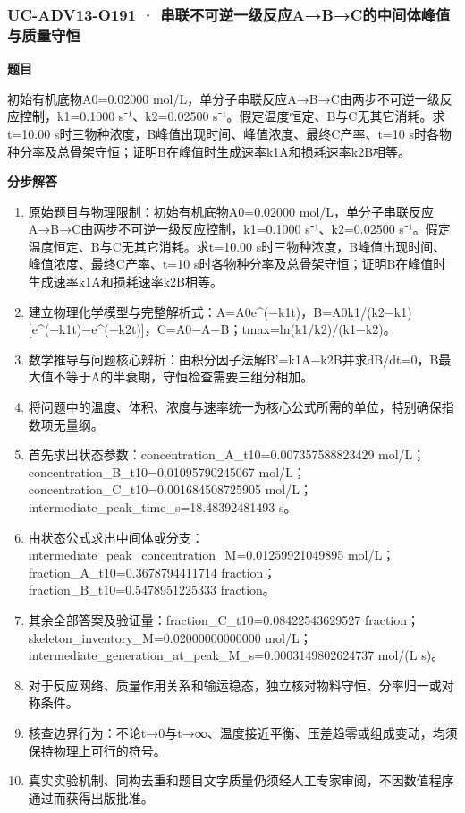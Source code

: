 \documentclass[UTF8,11pt,a4paper]{ctexart}
\begin{document}
\subsubsection*{UC-ADV13-O191 · 串联不可逆一级反应A→B→C的中间体峰值与质量守恒}
\noindent\textbf{题目}\par
初始有机底物A0=0.02000 mol/L，单分子串联反应A→B→C由两步不可逆一级反应控制，k1=0.1000 s⁻¹、k2=0.02500 s⁻¹。假定温度恒定、B与C无其它消耗。求t=10.00 s时三物种浓度，B峰值出现时间、峰值浓度、最终C产率、t=10 s时各物种分率及总骨架守恒；证明B在峰值时生成速率k1A和损耗速率k2B相等。\par
\medskip\noindent\textbf{分步解答}
\begin{enumerate}
\item 原始题目与物理限制：初始有机底物A0=0.02000 mol/L，单分子串联反应A→B→C由两步不可逆一级反应控制，k1=0.1000 s⁻¹、k2=0.02500 s⁻¹。假定温度恒定、B与C无其它消耗。求t=10.00 s时三物种浓度，B峰值出现时间、峰值浓度、最终C产率、t=10 s时各物种分率及总骨架守恒；证明B在峰值时生成速率k1A和损耗速率k2B相等。
\item 建立物理化学模型与完整解析式：A=A0e\textasciicircum{}(−k1t)，B=A0k1/(k2−k1)[e\textasciicircum{}(−k1t)−e\textasciicircum{}(−k2t)]，C=A0−A−B；tmax=ln(k1/k2)/(k1−k2)。
\item 数学推导与问题核心辨析：由积分因子法解B'=k1A−k2B并求dB/dt=0，B最大值不等于A的半衰期，守恒检查需要三组分相加。
\item 将问题中的温度、体积、浓度与速率统一为核心公式所需的单位，特别确保指数项无量纲。
\item 首先求出状态参数：concentration\_A\_t10=0.007357588823429 mol/L；concentration\_B\_t10=0.01095790245067 mol/L；concentration\_C\_t10=0.001684508725905 mol/L；intermediate\_peak\_time\_s=18.48392481493 s。
\item 由状态公式求出中间体或分支：intermediate\_peak\_concentration\_M=0.01259921049895 mol/L；fraction\_A\_t10=0.3678794411714 fraction；fraction\_B\_t10=0.5478951225333 fraction。
\item 其余全部答案及验证量：fraction\_C\_t10=0.08422543629527 fraction；skeleton\_inventory\_M=0.02000000000000 mol/L；intermediate\_generation\_at\_peak\_M\_s=0.0003149802624737 mol/(L s)。
\item 对于反应网络、质量作用关系和输运稳态，独立核对物料守恒、分率归一或对称条件。
\item 核查边界行为：不论t→0与t→∞、温度接近平衡、压差趋零或组成变动，均须保持物理上可行的符号。
\item 真实实验机制、同构去重和题目文字质量仍须经人工专家审阅，不因数值程序通过而获得出版批准。
\end{enumerate}
\end{document}
